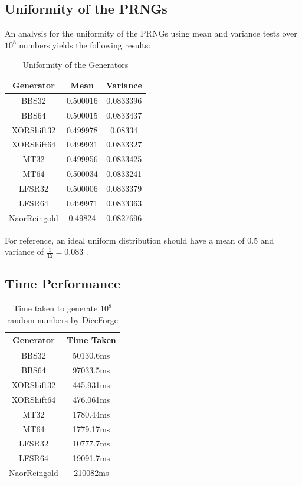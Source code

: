 \documentclass[titlepage, 11pt]{article}
\begin{document}
\subsection{Uniformity of the PRNGs}
An analysis for the uniformity of the PRNGs using mean and variance tests over $10^8$ numbers yields the following results:
\begin{table}[ht]
\centering
\begin{tabular}{|c|c|c|}
\hline
\textbf{Generator} & \textbf{Mean} & \textbf{Variance} \\ \hline
BBS32              & 0.500016      & 0.0833396         \\ \hline
BBS64              & 0.500015      & 0.0833437         \\ \hline
XORShift32         & 0.499978      & 0.08334           \\ \hline
XORShift64         & 0.499931      & 0.0833327         \\ \hline
MT32               & 0.499956      & 0.0833425         \\ \hline
MT64               & 0.500034      & 0.0833241         \\ \hline
LFSR32             & 0.500006      & 0.0833379         \\ \hline
LFSR64             & 0.499971      & 0.0833363         \\ \hline
NaorReingold       & 0.49824       & 0.0827696         \\ \hline
\end{tabular}
\caption{Uniformity of the Generators}
\label{tab:uniformity}
\end{table}
\newline
For reference, an ideal uniform distribution should have a mean of 0.5 and variance of $\frac{1}{12} = 0.08\overline{3}$ .

\subsection{Time Performance}
\begin{table}[ht]
\centering
\begin{tabular}{|c|c|}
\hline
\textbf{Generator} & \textbf{Time Taken} \\ \hline
BBS32              & 50130.6ms          \\ \hline
BBS64              & 97033.5ms          \\ \hline
XORShift32         & 445.931ms          \\ \hline
XORShift64         & 476.061ms          \\ \hline
MT32               & 1780.44ms          \\ \hline
MT64               & 1779.17ms          \\ \hline
LFSR32             & 10777.7ms          \\ \hline
LFSR64             & 19091.7ms          \\ \hline
NaorReingold       & 210082ms           \\ \hline
\end{tabular}
\caption{Time taken to generate $10^8$ random numbers by DiceForge}
\label{tab:time}
\end{table}
\end{document}
